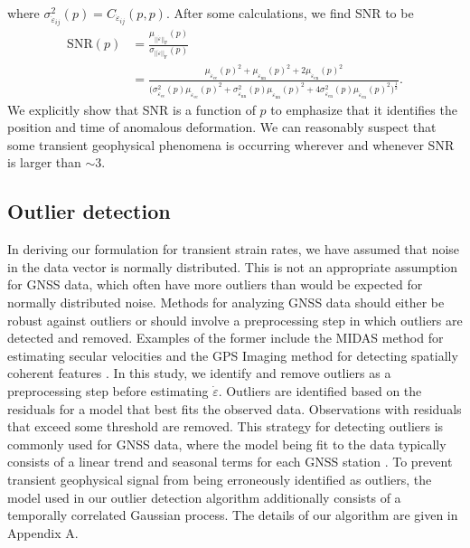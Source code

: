 \documentclass[extra,mreferee]{gji}
\begin{document}
where $\sigma^2_{\dot\varepsilon_{ij}}(p) = C_{\dot\varepsilon_{ij}}(p,p)$. After some calculations, we find SNR to be
\begin{align}\label{eq:SNR}
\mathrm{SNR}(p) &= \frac{\mu_{||\dot\varepsilon||_\mathrm{F}}(p)}{\sigma_{||\dot\varepsilon||_\mathrm{F}}(p)} \\
                &= \frac{\mu_{\dot\varepsilon_\mathrm{ee}}(p)^2 +
                        \mu_{\dot\varepsilon_\mathrm{nn}}(p)^2 +
                        2\mu_{\dot\varepsilon_\mathrm{en}}(p)^2}
                       {\big(\sigma^2_{\dot\varepsilon_\mathrm{ee}}(p)\mu_{\dot\varepsilon_\mathrm{ee}}(p)^2 + 
                             \sigma^2_{\dot\varepsilon_\mathrm{nn}}(p)\mu_{\dot\varepsilon_\mathrm{nn}}(p)^2 + 
                              4\sigma^2_{\dot\varepsilon_\mathrm{en}}(p)\mu_{\dot\varepsilon_\mathrm{en}}(p)^2
                        \big)^{\frac{1}{2}}}
.
\end{align}
We explicitly show that SNR is a function of $p$ to emphasize that it identifies the position and time of anomalous deformation. We can reasonably suspect that some transient geophysical phenomena is occurring wherever and whenever SNR is larger than ${\sim}3$.  

\subsection{Outlier detection}\label{sec:Outlier}
In deriving our formulation for transient strain rates, we have assumed that noise in the data vector is normally distributed. This is not an appropriate assumption for GNSS data, which often have more outliers than would be expected for normally distributed noise. Methods for analyzing GNSS data should either be robust against outliers or should involve a preprocessing step in which outliers are detected and removed. Examples of the former include the MIDAS method for estimating secular velocities \citep{Blewitt2016} and the GPS Imaging method for detecting spatially coherent features \citep{Hammond2016}. In this study, we identify and remove outliers as a preprocessing step before estimating $\dot\varepsilon$. Outliers are identified based on the residuals for a model that best fits the observed data. Observations with residuals that exceed some threshold are removed. This strategy for detecting outliers is commonly used for GNSS data, where the model being fit to the data typically consists of a linear trend and seasonal terms for each GNSS station \citep[e.g.,][]{Johansson2002,Dong2006,Bos2013}. To prevent transient geophysical signal from being erroneously identified as outliers, the model used in our outlier detection algorithm additionally consists of a temporally correlated Gaussian process. The details of our algorithm are given in Appendix A.  
\end{document}
